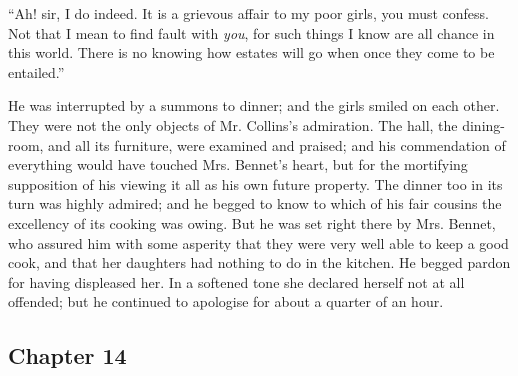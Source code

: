 

“Ah! sir, I do indeed. It is a grievous affair to my poor girls, you must confess. Not that I mean to find fault with {\em you}, for such things I know are all chance in this world. There is no knowing how estates will go when once they come to be entailed.”


He was interrupted by a summons to dinner; and the girls smiled on each other. They were not the only objects of Mr. Collins's admiration. The hall, the dining-room, and all its furniture, were examined and praised; and his commendation of everything would have touched Mrs. Bennet's heart, but for the mortifying supposition of his viewing it all as his own future property. The dinner too in its turn was highly admired; and he begged to know to which of his fair cousins the excellency of its cooking was owing. But he was set right there by Mrs. Bennet, who assured him with some asperity that they were very well able to keep a good cook, and that her daughters had nothing to do in the kitchen. He begged pardon for having displeased her. In a softened tone she declared herself not at all offended; but he continued to apologise for about a quarter of an hour.

\subsection[chapter-14]{\useURL[url14][][][]\from[url14] Chapter 14}

